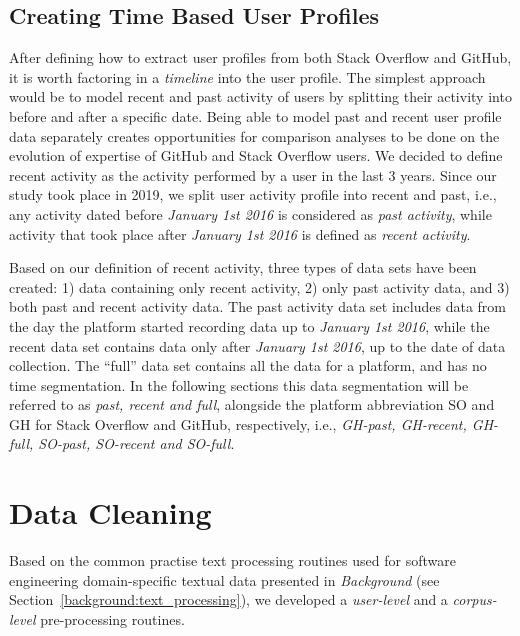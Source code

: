     \subsection{Creating Time Based User Profiles} \label{past_recent_full_segm}
        After defining how to extract user profiles from both Stack Overflow and GitHub, it is worth factoring in a \textit{timeline} into the user profile. The simplest approach would be to model recent and past activity of users by splitting their activity into before and after a specific date. Being able to model past and recent user profile data separately creates opportunities for comparison analyses to be done on the evolution of expertise of GitHub and Stack Overflow users. We decided to define recent activity as the activity performed by a user in the last 3 years. Since our study took place in 2019, we split user activity profile into recent and past, i.e., any activity dated before \textit{January 1st 2016} is considered as \textit{past activity}, while activity that took place after \textit{January 1st 2016} is defined as \textit{recent activity}. 
        
        Based on our definition of recent activity, three types of data sets have been created: 1) data containing only recent activity, 2) only past activity data, and 3) both past and recent activity data. The past activity data set includes data from the day the platform started recording data up to \textit{January 1st 2016}, while the recent data set contains data only after \textit{January 1st 2016}, up to the date of data collection. The ``full'' data set contains all the data for a platform, and has no time segmentation. In the following sections this data segmentation will be referred to as \emph{past, recent and full}, alongside the platform abbreviation SO and GH for Stack Overflow and GitHub, respectively, i.e.,  \emph{GH-past, GH-recent, GH-full, SO-past, SO-recent and SO-full}.

\section{Data Cleaning\label{sec:data_cleaning}}
    
    Based on the common practise text processing routines used for software engineering domain-specific textual data presented in \emph{Background} (see Section~\ref{background:text_processing}), we developed a \emph{user-level} and a \emph{corpus-level} pre-processing routines. 
    
